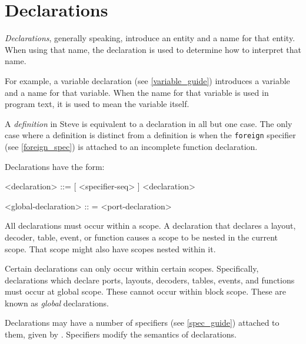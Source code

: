 \section{Declarations} \label{declaration_guide}

\textit{Declarations}, generally speaking, introduce an entity and a name for that entity. When using that name, the declaration is used to determine how to interpret that name.

For example, a variable declaration (see \ref{variable_guide}) introduces a variable and a name for that variable. When the name for that variable is used in program text, it is used to mean the variable itself.

A \textit{definition} in Steve is equivalent to a declaration in all but one case. The only case where a definition is distinct from a definition is when the \texttt{foreign} specifier (see \ref{foreign_spec}) is attached to an incomplete function declaration.

Declarations have the form:

\begin{minip}
\begin{grammar}
<declaration> ::=
[ <specifier-seq> ] <declaration>

<global-declaration> :: =
<port-declaration>
\end{grammar}
\end{minip}

All declarations must occur within a scope. A declaration that declares a layout, decoder, table, event, or function causes a scope to be nested in the current scope. That scope might also have scopes nested within it.

Certain declarations can only occur within certain scopes. Specifically, declarations which declare ports, layouts, decoders, tables, events, and functions must occur at global scope. These cannot occur within block scope. These are known as \textit{global} declarations.

Declarations may have a number of specifiers (see \ref{spec_guide}) attached to them, given by . Specifiers modify the semantics of declarations.

